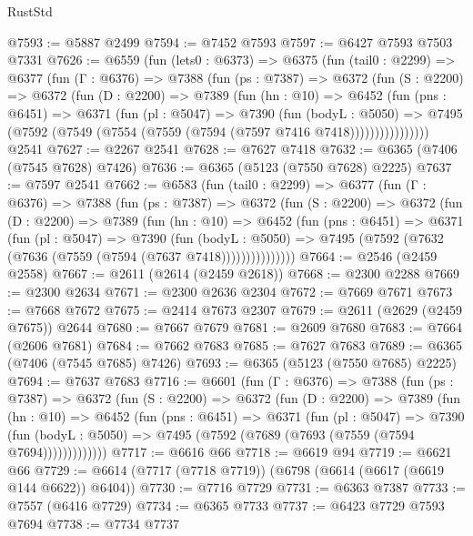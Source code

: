 \begin{lexlean}{RustStd}
\begin{coremodule}
@7593 := @5887 @2499
@7594 := @7452 @7593
@7597 := @6427 @7593 @7503 @7331
@7626 := @6559
    (fun (lets0 : @6373) =>
    @6375
      (fun (tail0 : @2299) =>
      @6377
        (fun (Γ : @6376) =>
        @7388
          (fun (ps : @7387) =>
          @6372
            (fun (S : @2200) =>
            @6372
              (fun (D : @2200) =>
              @7389
                (fun (hn : @10) =>
                @6452
                  (fun (pns : @6451) =>
                  @6371
                    (fun (pl : @5047) =>
                    @7390
                      (fun (bodyL : @5050) =>
                      @7495 (@7592 (@7549 (@7554 (@7559 (@7594 (@7597 @7416 @7418))))))))))))))))
    @2541
@7627 := @2267 @2541
@7628 := @7627 @7418
@7632 := @6365 (@7406 (@7545 @7628) @7426)
@7636 := @6365 (@5123 (@7550 @7628) @2225)
@7637 := @7597 @2541
@7662 := @6583
    (fun (tail0 : @2299) =>
    @6377
      (fun (Γ : @6376) =>
      @7388
        (fun (ps : @7387) =>
        @6372
          (fun (S : @2200) =>
          @6372
            (fun (D : @2200) =>
            @7389
              (fun (hn : @10) =>
              @6452
                (fun (pns : @6451) =>
                @6371
                  (fun (pl : @5047) =>
                  @7390
                    (fun (bodyL : @5050) =>
                    @7495 (@7592 (@7632 (@7636 (@7559 (@7594 (@7637 @7418)))))))))))))))
@7664 := @2546 (@2459 @2558)
@7667 := @2611 (@2614 (@2459 @2618))
@7668 := @2300 @2288
@7669 := @2300 @2634
@7671 := @2300 @2636 @2304
@7672 := @7669 @7671
@7673 := @7668 @7672
@7675 := @2414 @7673 @2307
@7679 := @2611 (@2629 (@2459 @7675)) @2644
@7680 := @7667 @7679
@7681 := @2609 @7680
@7683 := @7664 (@2606 @7681)
@7684 := @7662 @7683
@7685 := @7627 @7683
@7689 := @6365 (@7406 (@7545 @7685) @7426)
@7693 := @6365 (@5123 (@7550 @7685) @2225)
@7694 := @7637 @7683
@7716 := @6601
    (fun (Γ : @6376) =>
    @7388
      (fun (ps : @7387) =>
      @6372
        (fun (S : @2200) =>
        @6372
          (fun (D : @2200) =>
          @7389
            (fun (hn : @10) =>
            @6452
              (fun (pns : @6451) =>
              @6371
                (fun (pl : @5047) =>
                @7390
                  (fun (bodyL : @5050) =>
                  @7495 (@7592 (@7689 (@7693 (@7559 (@7594 @7694)))))))))))))
@7717 := @6616 @66
@7718 := @6619 @94
@7719 := @6621 @66
@7729 := @6614 (@7717 (@7718 @7719)) (@6798 (@6614 (@6617 (@6619 @144 @6622)) @6404))
@7730 := @7716 @7729
@7731 := @6363 @7387
@7733 := @7557 (@6416 @7729)
@7734 := @6365 @7733
@7737 := @6423 @7729 @7593 @7694
@7738 := @7734 @7737

\end{coremodule}
\end{lexlean}
